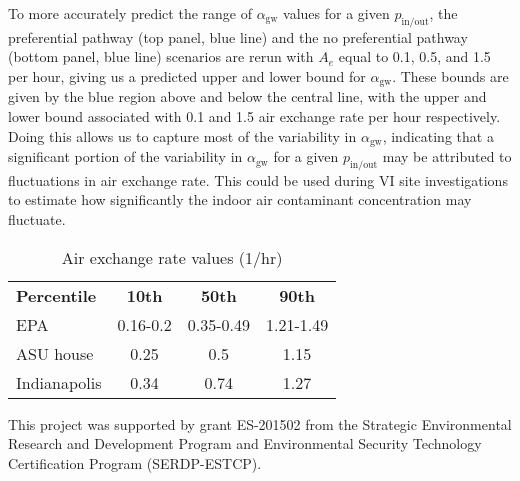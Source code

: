 \documentclass[journal=esthag,manuscript=article]{achemso}
\begin{document}
To more accurately predict the range of $\alpha_\mathrm{gw}$ values for a given $p_\mathrm{in/out}$, the preferential pathway (top panel, blue line) and the no preferential pathway (bottom panel, blue line) scenarios are rerun with $A_e$ equal to 0.1, 0.5, and 1.5 per hour, giving us a predicted upper and lower bound for $\alpha_\mathrm{gw}$.
These bounds are given by the blue region above and below the central line, with the upper and lower bound associated with 0.1 and 1.5 air exchange rate per hour respectively.
Doing this allows us to capture most of the variability in $\alpha_\mathrm{gw}$, indicating that a significant portion of the variability in $\alpha_\mathrm{gw}$ for a given $p_\mathrm{in/out}$ may be attributed to fluctuations in air exchange rate.
This could be used during VI site investigations to estimate how significantly the indoor air contaminant concentration may fluctuate.

\begin{table}[htb!]
  \caption{Air exchange rate values (1/hr)}\label{tbl:air_exchange_rate}
  \begin{tabular}{l c c c}
    \toprule
    \textbf{Percentile} & \textbf{10th} & \textbf{50th} & \textbf{90th} \\
    EPA\cite{u.s._epa_exposure_2011,m._d._koontz_estimation_1995} & 0.16-0.2 & 0.35-0.49 & 1.21-1.49 \\
    ASU house\cite{holton_temporal_2013,guo_identification_2015} & 0.25 & 0.5 & 1.15 \\
    Indianapolis\cite{u.s._environmental_protection_agency_assessment_2015} & 0.34 & 0.74 & 1.27 \\
    \bottomrule
  \end{tabular}
\end{table}

\begin{acknowledgement}
  This project was supported by grant ES-201502 from the Strategic Environmental Research and Development Program and Environmental Security Technology Certification Program (SERDP-ESTCP).
\end{acknowledgement}


\end{document}
